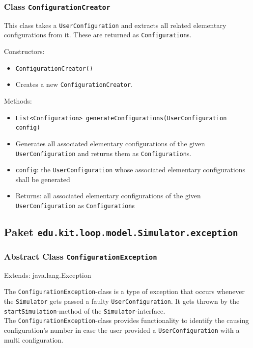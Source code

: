 \documentclass[parskip=full,11pt]{scrartcl}
\begin{document}
\subsubsection{Class \texttt{ConfigurationCreator}}
This class takes a \texttt{UserConfiguration} and extracts all related elementary configurations from it. These are returned as \texttt{Configuration}s.

Constructors:
\begin{itemize}\itemsep -10pt
\item \texttt{ConfigurationCreator()}
\item[] Creates a new \texttt{ConfigurationCreator}.
\end{itemize}

Methods:
\begin{itemize}\itemsep -10pt
\item \texttt{List<Configuration> generateConfigurations(UserConfiguration config)}
\item[] Generates all associated elementary configurations of the given \texttt{UserConfiguration} and returns them as \texttt{Configuration}s.
\item[] \texttt{config}: the \texttt{UserConfiguration} whose associated elementary configurations shall be generated
\item[] Returns: all associated elementary configurations of the given \texttt{UserConfiguration} as \texttt{Configuration}s
\end{itemize}

\subsection{Paket \texttt{edu.kit.loop.model.Simulator.exception}}

\subsubsection{Abstract Class \texttt{ConfigurationException }}
Extends: java.lang.Exception

The \texttt{ConfigurationException}-class is a type of exception that occurs whenever the \texttt{Simulator} gets passed a faulty \texttt{UserConfiguration}. It gets thrown by the \texttt{startSimulation}-method of the \texttt{Simulator}-interface.\\
The \texttt{ConfigurationException}-class provides functionality to identify the causing configuration's number in case the user provided a \texttt{UserConfiguration} with a multi configuration.
\end{document}
